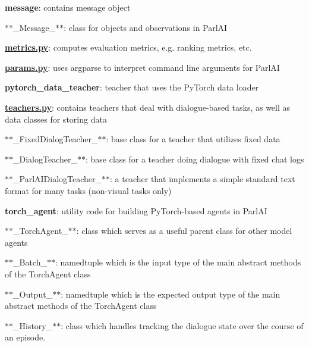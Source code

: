 \begin{DoxyItemize}
\item {\bfseries message}\+: contains message object
\begin{DoxyItemize}
\item $\ast$$\ast$\+\_\+\+Message\+\_\+$\ast$$\ast$\+: class for objects and observations in Parl\+AI
\end{DoxyItemize}
\item {\bfseries \hyperlink{metrics_8py}{metrics.\+py}}\+: computes evaluation metrics, e.\+g. ranking metrics, etc.
\item {\bfseries \hyperlink{params_8py}{params.\+py}}\+: uses argparse to interpret command line arguments for Parl\+AI
\item {\bfseries pytorch\+\_\+data\+\_\+teacher}\+: teacher that uses the Py\+Torch data loader
\item {\bfseries \hyperlink{teachers_8py}{teachers.\+py}}\+: contains teachers that deal with dialogue-\/based tasks, as well as data classes for storing data
\begin{DoxyItemize}
\item $\ast$$\ast$\+\_\+\+Fixed\+Dialog\+Teacher\+\_\+$\ast$$\ast$\+: base class for a teacher that utilizes fixed data
\item $\ast$$\ast$\+\_\+\+Dialog\+Teacher\+\_\+$\ast$$\ast$\+: base class for a teacher doing dialogue with fixed chat logs
\item $\ast$$\ast$\+\_\+\+Parl\+A\+I\+Dialog\+Teacher\+\_\+$\ast$$\ast$\+: a teacher that implements a simple standard text format for many tasks (non-\/visual tasks only)
\end{DoxyItemize}
\item {\bfseries torch\+\_\+agent}\+: utility code for building Py\+Torch-\/based agents in Parl\+AI
\begin{DoxyItemize}
\item $\ast$$\ast$\+\_\+\+Torch\+Agent\+\_\+$\ast$$\ast$\+: class which serves as a useful parent class for other model agents
\item $\ast$$\ast$\+\_\+\+Batch\+\_\+$\ast$$\ast$\+: namedtuple which is the input type of the main abstract methods of the Torch\+Agent class
\item $\ast$$\ast$\+\_\+\+Output\+\_\+$\ast$$\ast$\+: namedtuple which is the expected output type of the main abstract methods of the Torch\+Agent class
\item $\ast$$\ast$\+\_\+\+History\+\_\+$\ast$$\ast$\+: class which handles tracking the dialogue state over the course of an episode.
\end{DoxyItemize}

\end{DoxyItemize}
